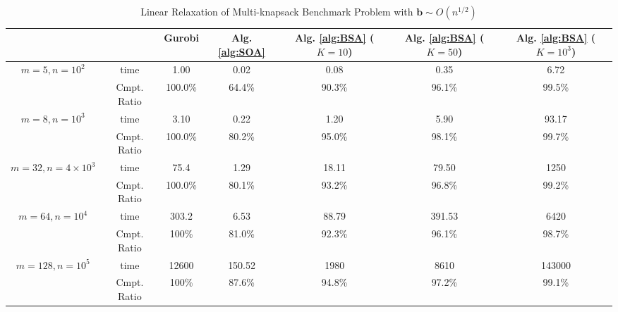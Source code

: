 \documentclass{article} %
\begin{document}
\begin{table}[ht!]
    \centering
    \small
    \begin{tabular}{cc|c|c|c|c|c}
    \toprule
         && Gurobi  & Alg. \ref{alg:SOA} & Alg. \ref{alg:BSA} ($K=10$) & Alg. \ref{alg:BSA} ($K=50$) & Alg. \ref{alg:BSA}  ($K=10^3$) \\
         \midrule
   \multirow{2}{*}{\scriptsize $m=5, n=10^2$}  & time & 1.00 & 0.02 & 0.08 & 0.35 & 6.72 \\
   & Cmpt. Ratio &100.0\% & 64.4\% & 90.3\% & 96.1\% & 99.5\%  \\
\midrule
  \multirow{2}{*}{\scriptsize $m=8, n=10^3$} &  time  & 3.10 & 0.22  & 1.20 & 5.90 & 93.17  \\ 
   &Cmpt. Ratio & 100.0\% & 80.2\% & 95.0\% & 98.1\% & 99.7\%   \\
\midrule
    \multirow{2}{*}{\scriptsize $m=32, n=4\times10^3$} &  time   &  75.4  & 1.29 & 18.11 & 79.50 & 1250  \\ 
  & Cmpt. Ratio & 100.0\% & 80.1\% & 93.2\% & 96.8\% & 99.2\% \\
\midrule
    \multirow{2}{*}{\scriptsize $m=64, n=10^4$} &  time   &  303.2  & 6.53 & 88.79 & 391.53 & 6420 \\ 
  & Cmpt. Ratio & 100\% & 81.0\% & 92.3\% & 96.1\% & 98.7\% \\ 
\midrule
    \multirow{2}{*}{\scriptsize $m=128, n=10^5$} &  time   &  12600  & 150.52 & 1980 & 8610 & 143000  \\ 
  & Cmpt. Ratio & 100\% & 87.6\% & 94.8\% & 97.2\% & 99.1\% \\  
   \bottomrule
    \end{tabular}
        \caption{Linear Relaxation of Multi-knapsack Benchmark Problem with $\bm{b}\sim O(n^{1/2})$}
    \label{tab:sol_1/2}
\end{table}
\end{document}
